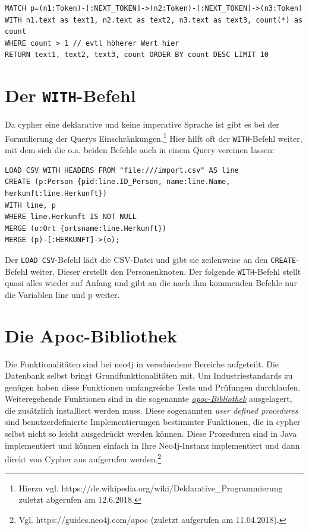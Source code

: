 \documentclass[ngerman,]{scrreprt}
\begin{document}
\begin{verbatim}
MATCH p=(n1:Token)-[:NEXT_TOKEN]->(n2:Token)-[:NEXT_TOKEN]->(n3:Token)
WITH n1.text as text1, n2.text as text2, n3.text as text3, count(*) as count
WHERE count > 1 // evtl höherer Wert hier
RETURN text1, text2, text3, count ORDER BY count DESC LIMIT 10
\end{verbatim}

\section{\texorpdfstring{Der \texttt{WITH}-Befehl}{Der WITH-Befehl}}\label{der-with-befehl}

Da cypher eine deklarative und keine imperative Sprache ist gibt es bei der Formulierung der Querys Einschränkungen.\footnote{Hierzu vgl. https://de.wikipedia.org/wiki/Deklarative\_Programmierung zuletzt abgerufen am 12.6.2018.} Hier hilft oft der \texttt{WITH}-Befehl weiter, mit dem sich die o.a. beiden Befehle auch in einem Query vereinen lassen:

\begin{verbatim}
LOAD CSV WITH HEADERS FROM "file:///import.csv" AS line
CREATE (p:Person {pid:line.ID_Person, name:line.Name, herkunft:line.Herkunft})
WITH line, p
WHERE line.Herkunft IS NOT NULL
MERGE (o:Ort {ortsname:line.Herkunft})
MERGE (p)-[:HERKUNFT]->(o);
\end{verbatim}

Der \texttt{LOAD\ CSV}-Befehl lädt die CSV-Datei und gibt sie zeilenweise an den \texttt{CREATE}-Befehl weiter. Dieser erstellt den Personenknoten. Der folgende \texttt{WITH}-Befehl stellt quasi alles wieder auf Anfang und gibt an die nach ihm kommenden Befehle nur die Variablen line und p weiter.

\section{Die Apoc-Bibliothek}\label{die-apoc-bibliothek}

Die Funktionalitäten sind bei neo4j in verschiedene Bereiche aufgeteilt. Die Datenbank selbst bringt Grundfunktionalitäten mit. Um Industriestandards zu genügen haben diese Funktionen umfangreiche Tests und Prüfungen durchlaufen. Weiteregehende Funktionen sind in die sogenannte \href{https://guides.neo4j.com/apoc}{\emph{apoc-Bibliothek}} ausgelagert, die zusätzlich installiert werden muss. Diese sogenannten \emph{user defined procedures} sind benutzerdefinierte Implementierungen bestimmter Funktionen, die in cypher selbst nicht so leicht ausgedrückt werden können. Diese Prozeduren sind in Java implementiert und können einfach in Ihre Neo4j-Instanz implementiert und dann direkt von Cypher aus aufgerufen werden.\footnote{Vgl. https://guides.neo4j.com/apoc (zuletzt aufgerufen am 11.04.2018).}
\end{document}
